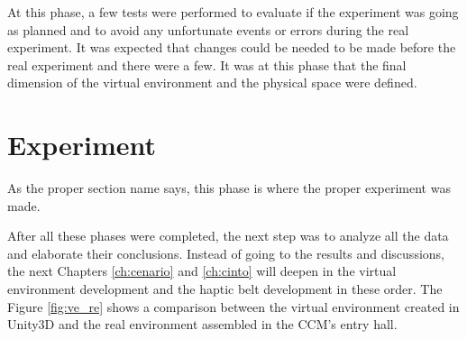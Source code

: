         At this phase, a few tests were performed to evaluate if the experiment was going as planned and to avoid any unfortunate events or errors during the real experiment. It was expected that changes could be needed to be made before the real experiment and there were a few. It was at this phase that the final dimension of the virtual environment and the physical space were defined.

\section{Experiment}
\label{sec:experiment}
        
        As the proper section name says, this phase is where the proper experiment was made.

After all these phases were completed, the next step was to analyze all the data and elaborate their conclusions. Instead of going to the results and discussions, the next Chapters \ref{ch:cenario} and \ref{ch:cinto} will deepen in the virtual environment development and the haptic belt development in these order. The Figure \ref{fig:ve_re} shows a comparison between the virtual environment created in Unity3D and the real environment assembled in the CCM's entry hall.

%

